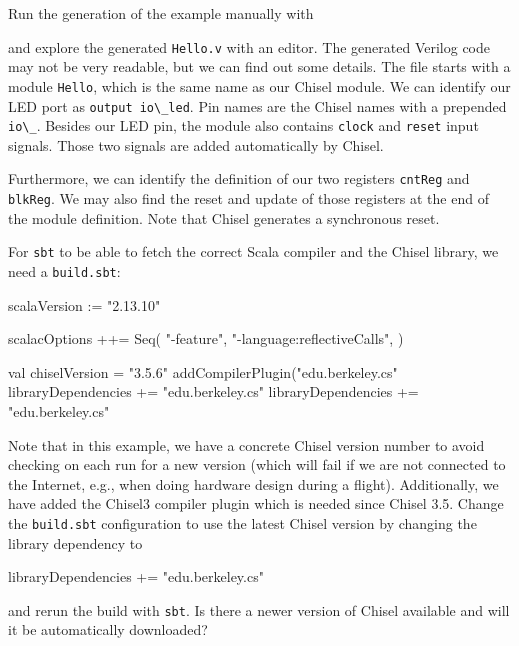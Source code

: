 \documentclass[%
    10pt,
    headinclude, footexclude,
    openright, %
    notitlepage,
    cleardoubleempty,
    headsepline,
    pointlessnumbers,
    bibtotoc, idxtotoc,
    ]{scrbook}
\newcommand{\code}[1]{{\lstinline[basicstyle=\small\ttfamily]{#1}}}
\begin{document}
\noindent Run the generation of the example manually with


and explore the generated \code{Hello.v} with an editor. The generated Verilog code may not be
very readable, but we can find out some details. The file starts with a module \code{Hello},
which is the same name as our Chisel module. We can identify our LED port as
\code{output io\_led}. Pin names are the Chisel names with a prepended \code{io\_}.
Besides our LED pin, the module also contains \code{clock} and \code{reset} input signals.
Those two signals are added automatically by Chisel.

Furthermore, we can identify the definition of our two registers \code{cntReg} and \code{blkReg}.
We may also find the reset and update of those registers at the end of the module definition.
Note that Chisel generates a synchronous reset.

For \code{sbt} to be able to fetch the correct Scala compiler and the Chisel library,
we need a \code{build.sbt}:

\begin{chisel}
scalaVersion := "2.13.10"

scalacOptions ++= Seq(
  "-feature",
  "-language:reflectiveCalls",
)

val chiselVersion = "3.5.6"
addCompilerPlugin("edu.berkeley.cs" %
libraryDependencies += "edu.berkeley.cs" %
libraryDependencies += "edu.berkeley.cs" %
\end{chisel}

\noindent Note that in this example, we have a concrete Chisel version number to avoid checking on
each run for a new version (which will fail if we are not connected to the Internet,
e.g., when doing hardware design during a flight). Additionally, we have added the Chisel3 compiler
plugin which is needed since Chisel 3.5.
Change the \code{build.sbt} configuration to use the latest Chisel version by changing the
library dependency to

\begin{chisel}
libraryDependencies += "edu.berkeley.cs" %
\end{chisel}

\noindent and rerun the build with \code{sbt}. Is there a newer version of Chisel
available and will it be automatically downloaded?
\end{document}
